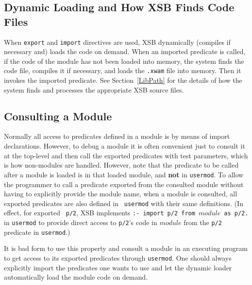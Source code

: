 \subsection{Dynamic Loading and How XSB Finds Code Files} 

When {\tt export} and {\tt import} directives are used, XSB
dynamically (compiles if necessary and) loads the code on demand.
When an imported predicate is called, if the code of the module has
not been loaded into memory, the system finds the code file, compiles
it if necessary, and loads the {\tt .xwam} file into memory.  Then it
invokes the imported predicate.  See Section~\ref{LibPath} for the
details of how the system finds and processes the appropriate XSB
source files.

\subsection{Consulting a Module}
Normally all access to predicates defined in a module is by means of
import declarations.  However, to debug a module it is often
convenient just to consult it at the top-level and then call the
exported predicates with test parameters, which is how non-modules are
handled.  However, note that the predicate to be called after a module
is loaded is in that loaded module, and {\bf not} in {\tt usermod}.  To
allow the programmer to call a predicate exported from the consulted
module without having to explicitly provide the module name, when a
module is consulted, all exported predicates are also defined in {\tt
  usermod} with their same definitions.  (In effect, for exported {\tt
  p/2}, XSB implements {\tt :- import p/2 from $module$ as p/2.} in
{\tt usermod} to provide direct access to {\tt p/2}'s code in $module$
from the {\tt p/2} predicate in {\tt usermod}.)

It is bad form to use this property and consult a module in an
executing program to get access to its exported predicates through
{\tt usermod}.  One should always explicitly import the predicates one
wants to use and let the dynamic loader automatically load the module
code on demand.

